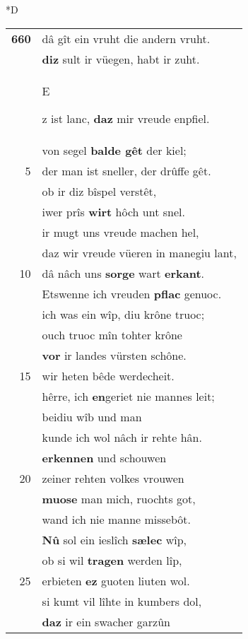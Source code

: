 \documentclass[8pt,a4paper,notitlepage]{article}
\begin{document}
\begin{table}[ht]
\begin{minipage}[t]{0.5\linewidth}
\small
\begin{center}*D
\end{center}
\begin{tabular}{rl}
\textbf{660} & dâ gît ein vruht die andern vruht.\\ 
 & \textbf{diz} sult ir vüegen, habt ir zuht.\\ 
 & \begin{large}E\end{large}z ist lanc, \textbf{daz} mir vreude enpfiel.\\ 
 & von segel \textbf{balde gêt} der kiel;\\ 
5 & der man ist sneller, der drûffe gêt.\\ 
 & ob ir diz bîspel verstêt,\\ 
 & iwer prîs \textbf{wirt} hôch unt snel.\\ 
 & ir mugt uns vreude machen hel,\\ 
 & daz wir vreude vüeren in manegiu lant,\\ 
10 & dâ nâch uns \textbf{sorge} wart \textbf{erkant}.\\ 
 & Etswenne ich vreuden \textbf{pflac} genuoc.\\ 
 & ich was ein wîp, diu krône truoc;\\ 
 & ouch truoc mîn tohter krône\\ 
 & \textbf{vor} ir landes vürsten schône.\\ 
15 & wir heten bêde werdecheit.\\ 
 & hêrre, ich \textbf{en}geriet nie mannes leit;\\ 
 & beidiu wîb und man\\ 
 & kunde ich wol nâch ir rehte hân.\\ 
 & \textbf{erkennen} und schouwen\\ 
20 & zeiner rehten volkes vrouwen\\ 
 & \textbf{muose} man mich, ruochts got,\\ 
 & wand ich nie manne missebôt.\\ 
 & \textbf{Nû} sol ein ieslîch \textbf{sælec} wîp,\\ 
 & ob si wil \textbf{tragen} werden lîp,\\ 
25 & erbieten \textbf{ez} guoten liuten wol.\\ 
 & si kumt vil lîhte in kumbers dol,\\ 
 & \textbf{daz} ir ein swacher garzûn\\ 

\end{tabular}
\end{minipage}
\end{table}
\end{document}
